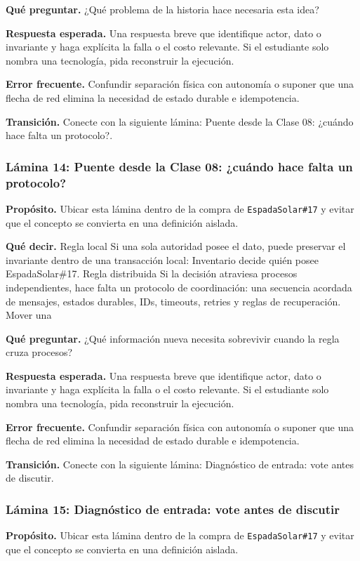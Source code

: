 \documentclass[variant=docente,cover=institutional,mode=screen]{ua-engineering-v6-article}
\begin{document}
\textbf{Qué preguntar.} ¿Qué problema de la historia hace necesaria esta idea?

\textbf{Respuesta esperada.} Una respuesta breve que identifique actor, dato o invariante y haga explícita la falla o el costo relevante. Si el estudiante solo nombra una tecnología, pida reconstruir la ejecución.

\textbf{Error frecuente.} Confundir separación física con autonomía o suponer que una flecha de red elimina la necesidad de estado durable e idempotencia.

\textbf{Transición.} Conecte con la siguiente lámina: Puente desde la Clase 08: ¿cuándo hace falta un protocolo?.

\subsubsection*{Lámina 14: Puente desde la Clase 08: ¿cuándo hace falta un protocolo?}
\textbf{Propósito.} Ubicar esta lámina dentro de la compra de \texttt{EspadaSolar\#17} y evitar que el concepto se convierta en una definición aislada.

\textbf{Qué decir.} Regla local Si una sola autoridad posee el dato, puede preservar el invariante dentro de una transacción local: Inventario decide quién posee EspadaSolar\#17. Regla distribuida Si la decisión atraviesa procesos independientes, hace falta un protocolo de coordinación: una secuencia acordada de mensajes, estados durables, IDs, timeouts, retries y reglas de recuperación. Mover una 

\textbf{Qué preguntar.} ¿Qué información nueva necesita sobrevivir cuando la regla cruza procesos?

\textbf{Respuesta esperada.} Una respuesta breve que identifique actor, dato o invariante y haga explícita la falla o el costo relevante. Si el estudiante solo nombra una tecnología, pida reconstruir la ejecución.

\textbf{Error frecuente.} Confundir separación física con autonomía o suponer que una flecha de red elimina la necesidad de estado durable e idempotencia.

\textbf{Transición.} Conecte con la siguiente lámina: Diagnóstico de entrada: vote antes de discutir.

\subsubsection*{Lámina 15: Diagnóstico de entrada: vote antes de discutir}
\textbf{Propósito.} Ubicar esta lámina dentro de la compra de \texttt{EspadaSolar\#17} y evitar que el concepto se convierta en una definición aislada.
\end{document}
